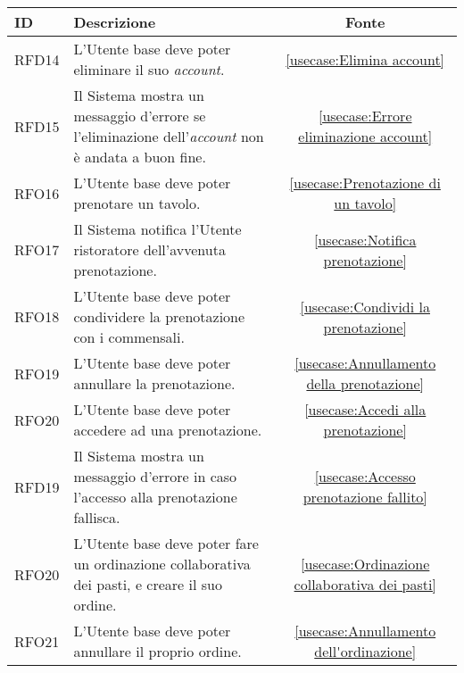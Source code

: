 \begin{table}[H]
	\renewcommand{\arraystretch}{1.5}
	\centering
	\begin{tabularx}{\textwidth}{l|X|c}
		\textbf{ID} & \textbf{Descrizione}                                                                                                      & \textbf{Fonte} \\
		\hline
		RFD14       & L'Utente base deve poter eliminare il suo \textit{account}.                                                          			&  \autoref{usecase:Elimina account}           \\
		\hline
		RFD15       & Il Sistema mostra un messaggio d'errore se l'eliminazione dell'\textit{account} non è andata a buon fine.                       & \autoref{usecase:Errore eliminazione account}            \\
		\hline
		RFO16       & L'Utente base deve poter prenotare un tavolo.                                                    								 & \autoref{usecase:Prenotazione di un tavolo}            \\
		\hline
		RFO17       & Il Sistema notifica l'Utente ristoratore dell'avvenuta prenotazione.                                                 			&  \autoref{usecase:Notifica prenotazione}           \\
		\hline
		RFO18       & L'Utente base deve poter condividere la prenotazione con i commensali.        												& \autoref{usecase:Condividi la prenotazione}            \\
		\hline
		RFO19       & L'Utente base deve poter annullare la prenotazione. 																			&  \autoref{usecase:Annullamento della prenotazione}           \\
		\hline
		RFO20       & L'Utente base deve poter accedere ad una prenotazione.						                                                 & \autoref{usecase:Accedi alla prenotazione}            \\
		\hline
		RFD19       & Il Sistema mostra un messaggio d'errore in caso l'accesso alla prenotazione fallisca.                          				 &  \autoref{usecase:Accesso prenotazione fallito}           \\
		\hline
		RFO20       & L'Utente base deve poter fare un ordinazione collaborativa dei pasti, e creare il suo ordine.                       			 &  \autoref{usecase:Ordinazione collaborativa dei pasti}           \\
		\hline
		RFO21       & L'Utente base deve poter annullare il proprio ordine.										                    				 &  \autoref{usecase:Annullamento dell'ordinazione}           \\

\end{tabularx}
\end{table}
